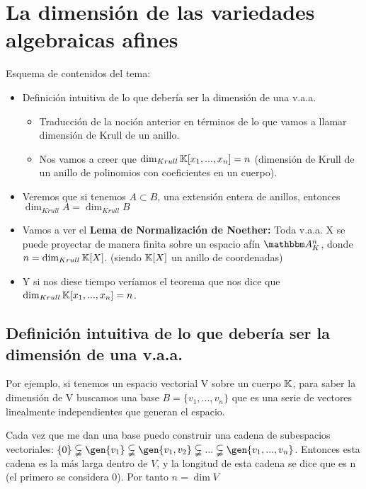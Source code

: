 
\chapter{La dimensión de las variedades algebraicas afines}

Esquema de contenidos del tema:

\begin{itemize}
	\item Definición intuitiva de lo que debería ser la dimensión de una v.a.a.
	\begin{itemize}
		\item Traducción de la noción anterior en términos de lo que vamos a llamar dimensión de Krull de un anillo.
		\item Nos vamos a creer que $\dim_{Krull}\mathbb{K}[x_1,...,x_n]=n$ (dimensión de Krull de un anillo de polinomios con coeficientes en un cuerpo).
	\end{itemize}
	\item Veremos que si tenemos $A \subset B$, una extensión entera de anillos, entonces $ \dim_{Krull} A = \dim_{Krull} B$
	\item Vamos a ver el \textbf{Lema de Normalización de Noether:} Toda v.a.a. X se puede proyectar de manera finita sobre un espacio afín $\Akn$, donde $n=\dim_{Krull}\mathbb{K}[X]$. (siendo $\mathbb{K}[X]$ un anillo de coordenadas) %
	\item Y si nos diese tiempo veríamos el teorema que nos dice que $\dim_{Krull}\mathbb{K}[x_1,...,x_n]=n$.
\end{itemize}

\section{Definición intuitiva de lo que debería ser la dimensión de una v.a.a.}

Por ejemplo, si tenemos un espacio vectorial V sobre un cuerpo $\mathbb{K}$, para saber la dimensión de V buscamos una base $B=\{ v_1,...,v_n\}$ que es una serie de vectores linealmente independientes que generan el espacio. 

Cada vez que me dan una base puedo construir una cadena de subespacios vectoriales:
$\{0\} \subsetneqq \gen{v_1} \subsetneqq \gen{v_1,v_2} \subsetneqq ... \subsetneqq \gen{v_1,...,v_n}$. Entonces esta cadena es la más larga dentro de $V$, y la longitud de esta cadena se dice que es n (el primero se considera 0). Por tanto $n= \dim V$

